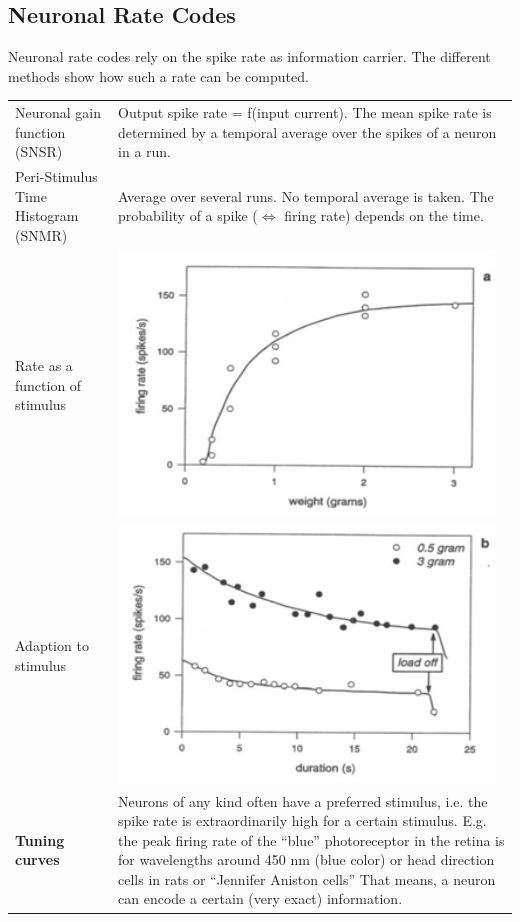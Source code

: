 \subsection{Neuronal Rate Codes}
Neuronal rate codes rely on the spike rate as information carrier. The different methods show how such a rate can be computed.\\
\begin{longtable}{p{4cm}p{15cm}}
Neuronal gain function (SNSR)	& Output spike rate = f(input current). The mean spike rate is determined by a temporal average over the spikes of a neuron in a run.\\
Peri-Stimulus Time Histogram (SNMR)	& Average over several runs. No temporal average is taken. The probability of a spike ($\Leftrightarrow$ firing rate) depends on the time.\\
Rate as a function of stimulus	& \includegraphics[width=10cm]{neuroinf_ratestimulus1.png}\\
Adaption to stimulus		& \includegraphics[width=10cm]{neuroinf_ratestimulus2.png}\\
\textbf{Tuning curves}		& Neurons of any kind often have a preferred stimulus, i.e. the spike rate is extraordinarily high for a certain stimulus. E.g. the peak firing rate of the ``blue'' photoreceptor in the retina is for wavelengths around 450 nm (blue color) or head direction cells in rats or ``Jennifer Aniston cells'' That means, a neuron can encode a certain (very exact) information.\\

\end{longtable}
